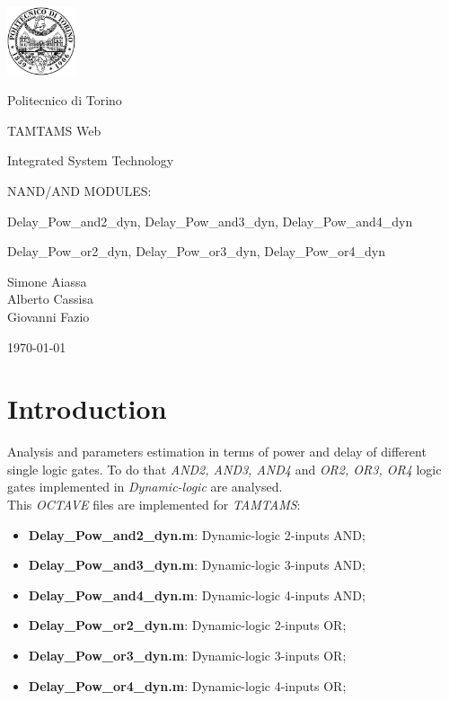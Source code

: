 \documentclass[12pt,  english, makeidx, a4paper, titlepage, oneside]{article}
\begin{document}
\begin{titlepage}
\vspace{1cm}
\centerline{
\includegraphics[width=2cm]{./img/logopoli.eps}}  
\centerline{\LARGE Politecnico di Torino}
\bigskip
\vspace{3cm}
\centerline{\LARGE TAMTAMS Web}
\vspace{0.5cm}
\centerline{\Large Integrated System Technology}
\vspace{3cm}
\centerline{\huge NAND/AND MODULES:}
\vspace{0.7cm}
\centerline{\large Delay\_Pow\_and2\_dyn, Delay\_Pow\_and3\_dyn,  Delay\_Pow\_and4\_dyn}
\vspace{0.3cm}
\centerline{\large Delay\_Pow\_or2\_dyn,  Delay\_Pow\_or3\_dyn,  Delay\_Pow\_or4\_dyn}
\bigskip
\vspace{5cm}
\centerline{\Large Simone Aiassa\\Alberto Cassisa\\Giovanni Fazio}
\vspace{1cm}
\centerline{\Large \today}
\end{titlepage}

\tableofcontents

\newpage

\lstset{language=Matlab}

\newpage


\section{Introduction}


Analysis and parameters estimation in terms of power and delay of different single logic gates.
To do that \textit{AND2, AND3, AND4}  and \textit{OR2, OR3, OR4} logic gates implemented in \textit{Dynamic-logic} are analysed. \\
This \textit{OCTAVE} files are implemented for \textit{TAMTAMS}: 
\begin{itemize}
\item \textbf{Delay\_Pow\_and2\_dyn.m}: Dynamic-logic 2-inputs AND;
\item \textbf{Delay\_Pow\_and3\_dyn.m}: Dynamic-logic 3-inputs AND;
\item \textbf{Delay\_Pow\_and4\_dyn.m}: Dynamic-logic 4-inputs AND;
\item \textbf{Delay\_Pow\_or2\_dyn.m}: Dynamic-logic 2-inputs OR;
\item \textbf{Delay\_Pow\_or3\_dyn.m}: Dynamic-logic 3-inputs OR;
\item \textbf{Delay\_Pow\_or4\_dyn.m}: Dynamic-logic 4-inputs OR;
\end{itemize}
\end{document}
